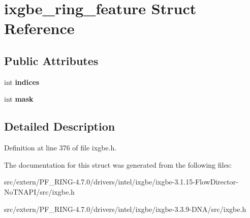 \hypertarget{structixgbe__ring__feature}{
\section{ixgbe\_\-ring\_\-feature Struct Reference}
\label{structixgbe__ring__feature}
}
\subsection*{Public Attributes}
\begin{DoxyCompactItemize}
\item 
\hypertarget{structixgbe__ring__feature_aec1d717ab94f5053b73d7d048b2e27b7}{
int {\bfseries indices}}
\label{structixgbe__ring__feature_aec1d717ab94f5053b73d7d048b2e27b7}

\item 
\hypertarget{structixgbe__ring__feature_ad45a5c817da292f1056c640e32822a80}{
int {\bfseries mask}}
\label{structixgbe__ring__feature_ad45a5c817da292f1056c640e32822a80}

\end{DoxyCompactItemize}


\subsection{Detailed Description}


Definition at line 376 of file ixgbe.h.



The documentation for this struct was generated from the following files:\begin{DoxyCompactItemize}
\item 
src/extern/PF\_\-RING-\/4.7.0/drivers/intel/ixgbe/ixgbe-\/3.1.15-\/FlowDirector-\/NoTNAPI/src/ixgbe.h\item 
src/extern/PF\_\-RING-\/4.7.0/drivers/intel/ixgbe/ixgbe-\/3.3.9-\/DNA/src/ixgbe.h\end{DoxyCompactItemize}
